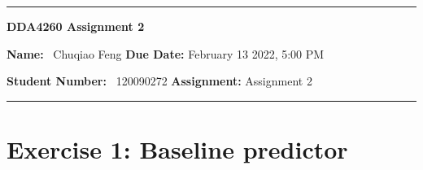 \documentclass{article}
\begin{document}
\rmfamily 
\hrule
\begin{center}
	\vspace{.4cm}
	{\textbf { \huge DDA4260 Assignment 2}}
\end{center}
\setlength{\baselineskip}{20pt}
\noindent
{\textbf{Name:} \ Chuqiao Feng \hspace{\fill} \textbf{Due Date:} February 13 2022, 5:00 PM \\ 
{\textbf{Student Number:} \ 120090272 \hspace{\fill} \textbf{Assignment:} Assignment 2 \\
\hrule

\section*{Exercise 1: Baseline predictor}
}}
\end{document}
